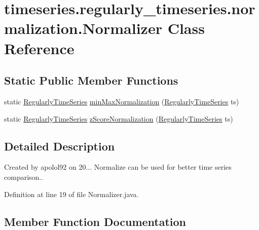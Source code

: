 \hypertarget{classtimeseries_1_1regularly__timeseries_1_1normalization_1_1_normalizer}{}\section{timeseries.\+regularly\+\_\+timeseries.\+normalization.\+Normalizer Class Reference}
\label{classtimeseries_1_1regularly__timeseries_1_1normalization_1_1_normalizer}
\subsection*{Static Public Member Functions}
\begin{DoxyCompactItemize}
\item 
static \hyperlink{classtimeseries_1_1_regularly_time_series}{Regularly\+Time\+Series} \hyperlink{classtimeseries_1_1regularly__timeseries_1_1normalization_1_1_normalizer_ae7fe6c21bded90c95238cb56f173b1e5}{min\+Max\+Normalization} (\hyperlink{classtimeseries_1_1_regularly_time_series}{Regularly\+Time\+Series} ts)
\item 
static \hyperlink{classtimeseries_1_1_regularly_time_series}{Regularly\+Time\+Series} \hyperlink{classtimeseries_1_1regularly__timeseries_1_1normalization_1_1_normalizer_a7fdf720affb6380a8626b626c313f3e0}{z\+Score\+Normalization} (\hyperlink{classtimeseries_1_1_regularly_time_series}{Regularly\+Time\+Series} ts)
\end{DoxyCompactItemize}


\subsection{Detailed Description}
Created by apolol92 on 20... Normalize can be used for better time series comparison.. 

Definition at line 19 of file Normalizer.\+java.



\subsection{Member Function Documentation}
\hypertarget{classtimeseries_1_1regularly__timeseries_1_1normalization_1_1_normalizer_ae7fe6c21bded90c95238cb56f173b1e5}{}
